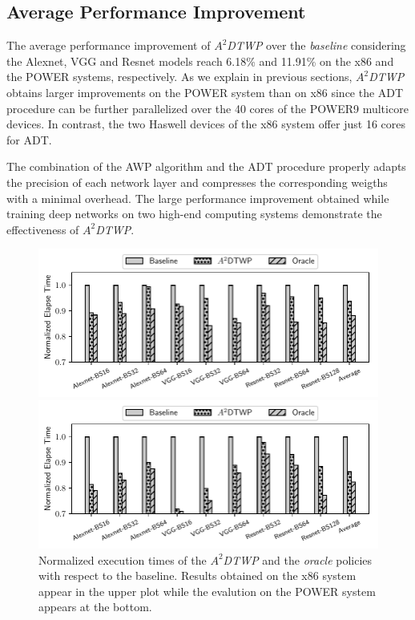 \subsection{Average Performance Improvement}
\label{sec:Average}
The average performance improvement of \textit{$A^2$DTWP} over the 
\textit{baseline} considering the Alexnet, VGG and Resnet models reach 6.18\% and 11.91\% on the x86 and the POWER systems, respectively. 
As we explain in previous sections, \textit{$A^2$DTWP} obtains larger improvements on the POWER system than on  
x86 since the ADT procedure can be further parallelized over the 40 cores of the POWER9 multicore devices.
In contrast, the two Haswell devices of the x86 system offer just 16 cores for ADT.

The combination of the AWP algorithm and the ADT procedure properly adapts the precision of each network layer and compresses the corresponding weigths with a minimal overhead.
The large performance improvement obtained while training deep networks on two high-end computing systems demonstrate the effectiveness of \textit{$A^2$DTWP}.

\begin{figure}%
    \centerline{\includegraphics[scale=0.65]{figs/all_bars.pdf}}
    \vspace{-0.2cm}
    \centerline{\includegraphics[scale=0.65]{figs/all_bars_p9.pdf}}
    \vspace{-0.5cm}
    \caption{Normalized execution times of the \textit{$A^2$DTWP} and the \textit{oracle} policies with respect to the baseline. 
Results obtained on the x86 system appear in the upper plot while the evalution on the POWER system appears at the bottom.} 
    \label{fig:all}
\end{figure}

